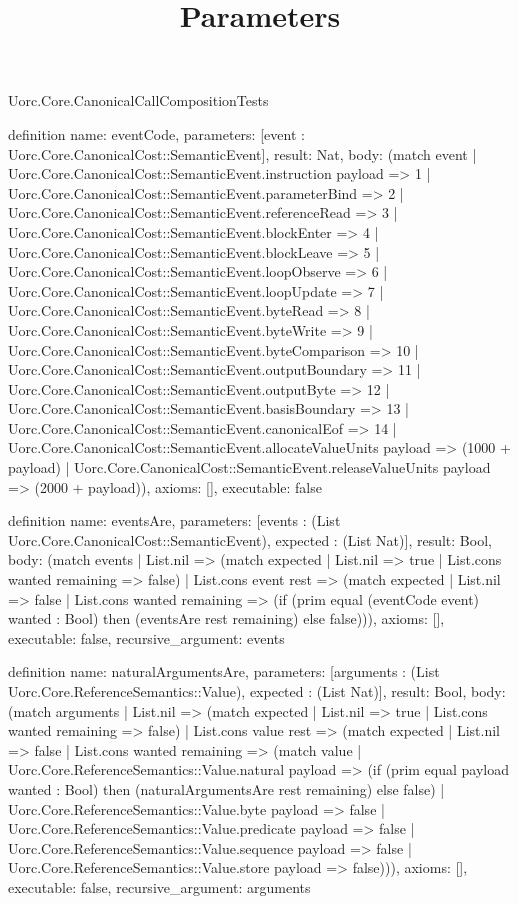 \begin{lexlean}{Uorc.Core.CanonicalCallCompositionTests}
\title{Parameters}
\begin{semanticmodule}
definition{
  name: eventCode,
  parameters: [event : Uorc.Core.CanonicalCost::SemanticEvent],
  result: Nat,
  body: (match event
    | Uorc.Core.CanonicalCost::SemanticEvent.instruction payload => 1
    | Uorc.Core.CanonicalCost::SemanticEvent.parameterBind => 2
    | Uorc.Core.CanonicalCost::SemanticEvent.referenceRead => 3
    | Uorc.Core.CanonicalCost::SemanticEvent.blockEnter => 4
    | Uorc.Core.CanonicalCost::SemanticEvent.blockLeave => 5
    | Uorc.Core.CanonicalCost::SemanticEvent.loopObserve => 6
    | Uorc.Core.CanonicalCost::SemanticEvent.loopUpdate => 7
    | Uorc.Core.CanonicalCost::SemanticEvent.byteRead => 8
    | Uorc.Core.CanonicalCost::SemanticEvent.byteWrite => 9
    | Uorc.Core.CanonicalCost::SemanticEvent.byteComparison => 10
    | Uorc.Core.CanonicalCost::SemanticEvent.outputBoundary => 11
    | Uorc.Core.CanonicalCost::SemanticEvent.outputByte => 12
    | Uorc.Core.CanonicalCost::SemanticEvent.basisBoundary => 13
    | Uorc.Core.CanonicalCost::SemanticEvent.canonicalEof => 14
    | Uorc.Core.CanonicalCost::SemanticEvent.allocateValueUnits payload => (1000 + payload)
    | Uorc.Core.CanonicalCost::SemanticEvent.releaseValueUnits payload => (2000 + payload)),
  axioms: [],
  executable: false
}

definition{
  name: eventsAre,
  parameters: [events : (List Uorc.Core.CanonicalCost::SemanticEvent), expected : (List Nat)],
  result: Bool,
  body: (match events
    | List.nil => (match expected | List.nil => true | List.cons wanted remaining => false)
    | List.cons event rest => (match expected
      | List.nil => false
      | List.cons wanted remaining => (if (prim equal (eventCode event) wanted : Bool) then (eventsAre rest remaining) else false))),
  axioms: [],
  executable: false,
  recursive_argument: events
}

definition{
  name: naturalArgumentsAre,
  parameters: [arguments : (List Uorc.Core.ReferenceSemantics::Value), expected : (List Nat)],
  result: Bool,
  body: (match arguments
    | List.nil => (match expected | List.nil => true | List.cons wanted remaining => false)
    | List.cons value rest => (match expected
      | List.nil => false
      | List.cons wanted remaining => (match value
        | Uorc.Core.ReferenceSemantics::Value.natural payload => (if (prim equal payload wanted : Bool) then (naturalArgumentsAre rest remaining) else false)
        | Uorc.Core.ReferenceSemantics::Value.byte payload => false
        | Uorc.Core.ReferenceSemantics::Value.predicate payload => false
        | Uorc.Core.ReferenceSemantics::Value.sequence payload => false
        | Uorc.Core.ReferenceSemantics::Value.store payload => false))),
  axioms: [],
  executable: false,
  recursive_argument: arguments
}


\end{semanticmodule}
\end{lexlean}
